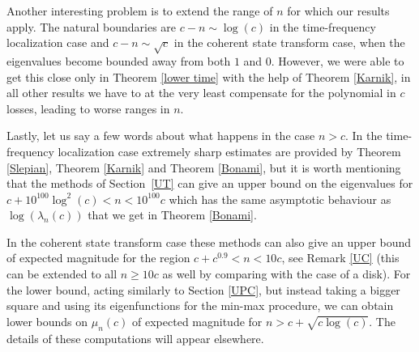 \documentclass[12pt]{amsart}
\numberwithin{equation}{section}
\begin{document}
Another interesting problem is to extend the range of $n$ for which our results apply. The natural boundaries are $c-n\sim \log(c)$ in the time-frequency localization case and $c-n\sim \sqrt{c}$ in the coherent state transform case, when the eigenvalues become bounded away from both $1$ and $0$. However, we were able to get this close only in Theorem \ref{lower time} with the help of Theorem \ref{Karnik}, in all other results we have to at the very least compensate for the polynomial in $c$ losses, leading to worse ranges in $n$.

Lastly, let us say a few words about what happens in the case $n > c$. In the time-frequency localization case extremely sharp estimates are provided by Theorem \ref{Slepian}, Theorem \ref{Karnik} and Theorem \ref{Bonami}, but it is worth mentioning that the methods of Section~\ref{UT} can give an upper bound on the eigenvalues for $c+10^{100}\log^2(c) < n < 10^{100}c$ which has the same asymptotic behaviour as $\log(\lambda_n(c))$ that we get in Theorem \ref{Bonami}. 

In the coherent state transform case these methods can also give an upper bound of expected magnitude for the region $c + c^{0.9} < n < 10c$, see Remark \ref{UC} (this can be extended to all $n \ge 10c$ as well by comparing with the case of a disk). For the lower bound, acting similarly to Section \ref{UPC}, but instead taking a bigger square and using its eigenfunctions for the min-max procedure, we can obtain lower bounds on $\mu_n(c)$ of expected magnitude for $n > c + \sqrt{c\log(c)}$. The details of these computations will appear elsewhere.
\end{document}
